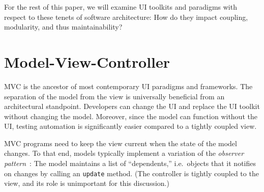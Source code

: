 \documentclass[sigplan,review,screen]{acmart}
\begin{document}
For the rest of this paper, we will examine UI toolkits and paradigms
with respect to these tenets of software architecture: How do they
impact coupling, modularity, and thus maintainability?  


\section{Model-View-Controller}
\label{sec:mvc}
  

MVC is the ancestor of most contemporary UI
paradigms and frameworks.  The separation of the model from the view
is universally beneficial from an architectural standpoint.
Developers can change the UI and replace the UI toolkit without
changing the model.  Moreover, since the model can function without
the UI, testing automation is significantly easier compared to a
tightly coupled view.

MVC programs need to keep the view current when the state of the model
changes.  To that end, models typically implement a variation of the
\textit{observer pattern}~\cite{GoF}: The model maintains a list of
``dependents,'' i.e.\ objects that it notifies on changes by calling
an \texttt{update} method.  (The controller is tightly coupled to the
view, and its role is unimportant for this discussion.)
\end{document}
